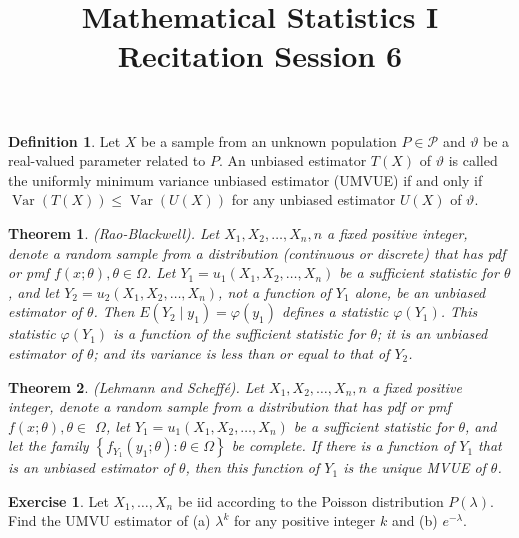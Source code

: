 \documentclass{article}
\title{Mathematical Statistics I\\ Recitation Session 6}
\date{}
\newtheorem*{theorem*}{Theorem}
\theoremstyle{definition}
\newtheorem{definition}{Definition}
\newtheorem*{exercise*}{Exercise}
\begin{document}
	\maketitle
	
	\begin{definition}
		Let $X$ be a sample from an unknown population $P \in \mathcal{P}$ and $\vartheta$ be a real-valued parameter related to $P$. An unbiased estimator $T(X)$ of $\vartheta$ is called the uniformly minimum variance unbiased estimator (UMVUE) if and only if $\operatorname{Var}(T(X)) \leq \operatorname{Var}(U(X))$ for any unbiased estimator $U(X)$ of $\vartheta$.
	\end{definition}
	
	\begin{theorem*}
		(Rao-Blackwell). Let $X_1, X_2, \ldots, X_n, n$ a fixed positive integer, denote a random sample from a distribution (continuous or discrete) that has pdf or pmf $f(x ; \theta), \theta \in \Omega$. Let $Y_1=u_1\left(X_1, X_2, \ldots, X_n\right)$ be a sufficient statistic for $\theta$, and let $Y_2=u_2\left(X_1, X_2, \ldots, X_n\right)$, not a function of $Y_1$ alone, be an unbiased estimator of $\theta$. Then $E\left(Y_2 \mid y_1\right)=\varphi\left(y_1\right)$ defines a statistic $\varphi\left(Y_1\right)$. This statistic $\varphi\left(Y_1\right)$ is a function of the sufficient statistic for $\theta$; it is an unbiased estimator of $\theta$; and its variance is less than or equal to that of $Y_2$.
	\end{theorem*}
	
	\begin{theorem*}
		(Lehmann and Scheffé). Let $X_1, X_2, \ldots, X_n, n$ a fixed positive integer, denote a random sample from a distribution that has pdf or pmf $f(x ; \theta), \theta \in$ $\Omega$, let $Y_1=u_1\left(X_1, X_2, \ldots, X_n\right)$ be a sufficient statistic for $\theta$, and let the family $\left\{f_{Y_1}\left(y_1 ; \theta\right): \theta \in \Omega\right\}$ be complete. If there is a function of $Y_1$ that is an unbiased estimator of $\theta$, then this function of $Y_1$ is the unique MVUE of $\theta$.
	\end{theorem*}
	
	\begin{exercise*}
		Let $X_1, \ldots, X_n$ be iid according to the Poisson distribution $P(\lambda)$. Find the UMVU estimator of (a) $\lambda^k$ for any positive integer $k$ and (b) $e^{-\lambda}$.
	\end{exercise*}
	
\end{document}
